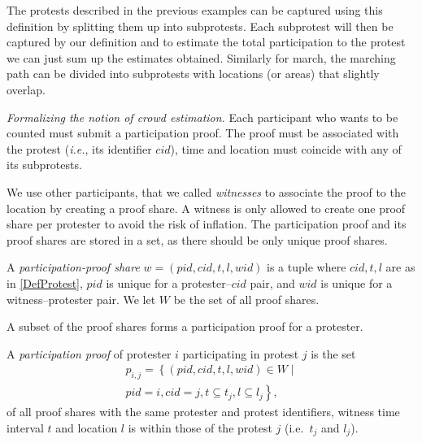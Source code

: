 The protests described in the previous examples can be captured using this definition by splitting 
them up into subprotests.
Each subprotest will then be captured by our definition and to estimate the total participation to the protest we can just sum up the estimates obtained.
Similarly for march, the marching path can be divided into subprotests with locations (or areas) that slightly overlap.

\emph{Formalizing the notion of crowd estimation.} Each participant who wants to be counted must submit a participation proof.
The proof must be associated with the protest (\emph{i.e.}, its identifier \(cid\)), time and location must coincide with any of its subprotests.

We use other participants, that we called \emph{witnesses} to associate the proof to the location by creating a proof 
share.
A witness is only allowed to create one proof share per protester to avoid the risk of inflation.
The participation proof and its proof shares are stored in a set, as there should be only unique proof shares.

\begin{definition}
  A \emph{participation-proof share} \(w = (pid, cid, t, l, wid)\) is a tuple 
  where
  \(cid, t, l\) are as in \cref{DefProtest},
  \(pid\) is unique for a protester--\(cid\) pair, and
  \(wid\) is unique for a witness--protester pair.
  We let \(W\) be the set of all proof shares.
\end{definition}

A subset of the proof shares forms a participation proof for a protester.

\begin{definition}
  A \emph{participation proof} of protester \(i\) participating in protest \(j\) 
  is the set
  \begin{multline}
    \nonumber
    p_{i, j} =
    \left\{ (pid, cid, t, l, wid)\in W \mid \right. \\
    \left. pid = i, cid = j,
    t \subseteq t_j, l\subseteq l_j \right\},
  \end{multline}
  of all proof shares with the same protester and protest identifiers, witness 
  time interval \(t\) and location \(l\) is within those of the protest \(j\) 
  (i.e.\ \(t_j\) and \(l_j\)).
\end{definition}

